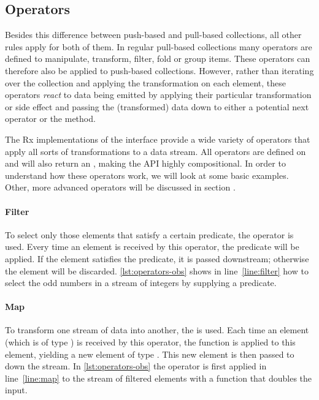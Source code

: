\subsection{Operators}
\label{subsec:operators}
Besides this difference between push-based and pull-based collections, all other rules apply for both of them. In regular pull-based collections many operators are defined to manipulate, transform, filter, fold or group items. These operators can therefore also be applied to push-based collections. However, rather than iterating over the collection and applying the transformation on each element, these operators \emph{react} to data being emitted by applying their particular transformation or side effect and passing the (transformed) data down to either a potential next operator or the  method.

The Rx implementations of the \obs interface provide a wide variety of operators that apply all sorts of transformations to a data stream. All operators are defined on \obs and will also return an \obs, making the API highly compositional. In order to understand how these operators work, we will look at some basic examples. Other, more advanced operators will be discussed in section .

\paragraph{Filter}To select only those elements that satisfy a certain predicate, the operator  is used. Every time an element is received by this operator, the predicate  will be applied. If the element satisfies the predicate, it is passed downstream; otherwise the element will be discarded. \autoref{lst:operators-obs} shows in line~\ref{line:filter} how to select the odd numbers in a stream of integers by supplying a predicate.

\paragraph{Map}To transform one stream of data into another, the  is used. Each time an element (which is of type ) is received by this operator, the function  is applied to this element, yielding a new element of type . This new element is then passed to down the stream. In \autoref{lst:operators-obs} the  operator is first applied in line~\ref{line:map} to the stream of filtered elements with a function that doubles the input.

